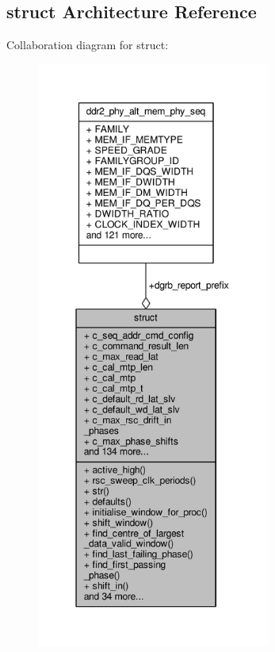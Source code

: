 \subsection{struct Architecture Reference}
\label{classddr2__phy__alt__mem__phy__dgrb_1_1struct}


Collaboration diagram for struct\+:\nopagebreak
\begin{figure}[H]
\begin{center}
\leavevmode
\includegraphics[height=550pt]{da/d1b/classddr2__phy__alt__mem__phy__dgrb_1_1struct__coll__graph}
\end{center}
\end{figure}
